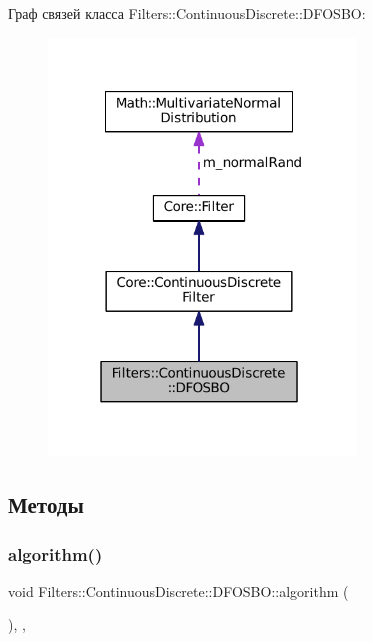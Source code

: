 Граф связей класса Filters\+:\+:Continuous\+Discrete\+:\+:D\+F\+O\+S\+BO\+:
\nopagebreak
\begin{figure}[H]
\begin{center}
\leavevmode
\includegraphics[width=232pt]{class_filters_1_1_continuous_discrete_1_1_d_f_o_s_b_o__coll__graph}
\end{center}
\end{figure}


\subsection{Методы}
\hypertarget{class_filters_1_1_continuous_discrete_1_1_d_f_o_s_b_o_ab911983ab9ff8e22dc68e33fdb4601b6}{}\label{class_filters_1_1_continuous_discrete_1_1_d_f_o_s_b_o_ab911983ab9ff8e22dc68e33fdb4601b6} 
\subsubsection{\texorpdfstring{algorithm()}{algorithm()}}
{\footnotesize\ttfamily void Filters\+::\+Continuous\+Discrete\+::\+D\+F\+O\+S\+B\+O\+::algorithm (\begin{DoxyParamCaption}{ }\end{DoxyParamCaption})\hspace{0.3cm}{\ttfamily [override]}, {\ttfamily [protected]}, {\ttfamily [virtual]}}



